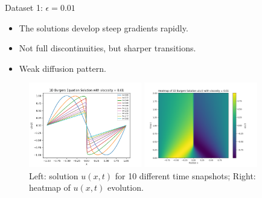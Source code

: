 \begin{secframe}

\begin{block}{Dataset 1: $\epsilon = 0.01$}
\begin{itemize}
  \item \small The solutions develop steep gradients rapidly.
  \item \small Not full discontinuities, but sharper transitions.
  \item \small Weak diffusion pattern.
\end{itemize}
\end{block}

\begin{figure}[h!]
    \centering
    \begin{minipage}[t]{0.48\linewidth}
        \centering
        \includegraphics[height=3.7cm]{images/graphical_visualization_1DBurgers_visc_001.png}
    \end{minipage}\hfill
    \begin{minipage}[t]{0.48\linewidth}
        \centering
        \includegraphics[height=3.7cm]{images/Heatmap_1DBurgers_visc_001.png}
    \end{minipage}
    \caption{\scriptsize Left: solution $u(x,t)$ for 10 different time snapshots; Right: heatmap of $u(x,t)$ evolution.}
\end{figure}

\end{secframe}

